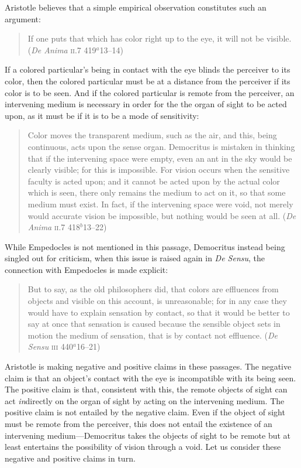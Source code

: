 Aristotle believes that a simple empirical observation constitutes such an argument:
\begin{quote}
	If one puts that which has color right up to the eye, it will not be visible. (\emph{De Anima} \textsc{ii}.7 419\( ^{a} \)13--14)
\end{quote}
If a colored particular's being in contact with the eye blinds the perceiver to its color, then the colored particular must be at a distance from the perceiver if its color is to be seen. And if the colored particular is remote from the perceiver, an intervening medium is necessary in order for the the organ of sight to be acted upon, as it must be if it is to be a mode of sensitivity:
\begin{quote}
	Color moves the transparent medium, such as the air, and this, being continuous, acts upon the sense organ. Democritus is mistaken in thinking that if the intervening space were empty, even an ant in the sky would be clearly visible; for this is impossible. For vision occurs when the sensitive faculty is acted upon; and it cannot be acted upon by the actual color which is seen, there only remains the medium to act on it, so that some medium must exist. In fact, if the intervening space were void, not merely would accurate vision be impossible, but nothing would be seen at all. (\emph{De Anima} \textsc{ii}.7 418\( ^{b} \)13--22)
\end{quote}
While Empedocles is not mentioned in this passage, Democritus instead being singled out for criticism, when this issue is raised again in \emph{De Sensu}, the connection with Empedocles is made explicit:
\begin{quote}
	But to say, as the old philosophers did, that colors are effluences from objects and visible on this account, is unreasonable; for in any case they would have to explain sensation by contact, so that it would be better to say at once that sensation is caused because the sensible object sets in motion the medium of sensation, that is by contact not effluence. (\emph{De Sensu} \textsc{iii} 440\( ^{a} \)16--21)
\end{quote}

Aristotle is making negative and positive claims in these passages. The negative claim is that an object's contact with the eye is incompatible with its being seen. The positive claim is that, consistent with this, the remote objects of sight can act \emph{in}directly on the organ of sight by acting on the intervening medium. The positive claim is not entailed by the negative claim. Even if the object of sight must be remote from the perceiver, this does not entail the existence of an intervening medium---Democritus takes the objects of sight to be remote but at least entertains the possibility of vision through a void. Let us consider these negative and positive claims in turn.

